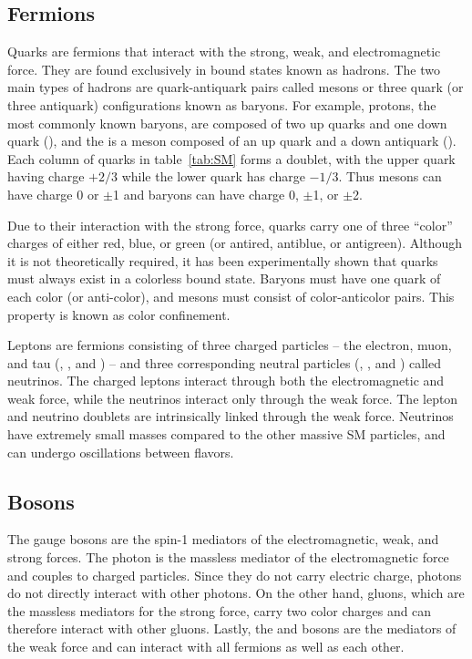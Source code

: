 \subsection{Fermions} \label{sec:sm_quarks}
Quarks are fermions that interact with the strong, weak, and electromagnetic force. They are found exclusively in bound states known as hadrons. The two main types of hadrons are quark-antiquark pairs called mesons or three quark (or three antiquark) configurations known as baryons. For example, protons, the most commonly known baryons, are composed of two up quarks and one down quark (\PQuns\PQuns\PQdns), and the \PGpp is a meson composed of an up quark and a down antiquark (\PQuns\PAQdns). Each column of quarks in table~\ref{tab:SM} forms a doublet, with the upper quark having charge $+2/3$ while the lower quark has charge $-1/3$. Thus mesons can have charge 0 or $\pm$1 and baryons can have charge 0, $\pm$1, or $\pm$2.

Due to their interaction with the strong force, quarks carry one of three ``color'' charges of either red, blue, or green (or antired, antiblue, or antigreen). Although it is not theoretically required, it has been experimentally shown that quarks must always exist in a colorless bound state. Baryons must have one quark of each color (or anti-color), and mesons must consist of color-anticolor pairs. This property is known as color confinement.

Leptons are fermions consisting of three charged particles -- the electron, muon, and tau (\Pe, \PGm, and \PGt) -- and three corresponding neutral particles (\PGne, \PGnGm, and \PGnGt) called neutrinos. The charged leptons interact through both the electromagnetic and weak force, while the neutrinos interact only through the weak force. The lepton and neutrino doublets are intrinsically linked through the weak force. Neutrinos have extremely small masses compared to the other massive SM particles, and can undergo oscillations between flavors.

\subsection{Bosons} \label{sec:sm_bosons}
The gauge bosons are the spin-1 mediators of the electromagnetic, weak, and strong forces. The photon is the massless mediator of the electromagnetic force and couples to charged particles. Since they do not carry electric charge, photons do not directly interact with other photons. On the other hand, gluons, which are the massless mediators for the strong force, carry two color charges and can therefore interact with other gluons. Lastly, the \PZ and \PWpm bosons are the mediators of the weak force and can interact with all fermions as well as each other.


